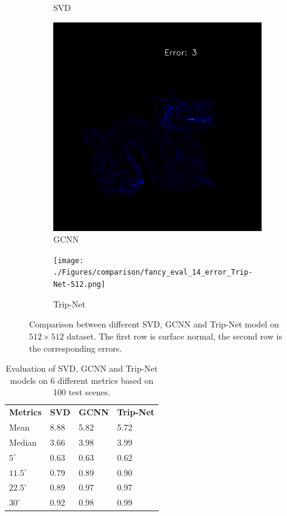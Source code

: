 \documentclass[border=15pt, multi, tikz]{article}
\newcommand{\tabhead}[1]{\textbf{#1}}
\begin{document}
\begin{figure}[H]
\begin{subfigure}[b]{0.24\linewidth}
		\caption{SVD}
	\end{subfigure}
	\begin{subfigure}[b]{0.24\linewidth}
		\includegraphics[width=\linewidth]{./Figures/comparison/fancy_eval_22_error_GCNN-512.png}
		\caption{GCNN}
	\end{subfigure}
	\begin{subfigure}[b]{0.24\linewidth}
		\texttt{[image: ./Figures/comparison/fancy\_eval\_14\_error\_Trip-Net-512.png]}
		\caption{Trip-Net}
	\end{subfigure}

	
	
	\caption{Comparison between different SVD, GCNN and Trip-Net model on $ 512\times 512 $ dataset. The first row is surface normal, the second row is the corresponding errors. }
	\label{fig:high_resolution_eval}
\end{figure}

\begin{table}[H]
	\centering
	\begin{tabular}{l l l l }
		\tabhead{Metrics} & \tabhead{SVD} & \tabhead{GCNN} & \tabhead{Trip-Net} \\
		Mean  					& 8.88 & 5.82 & 5.72 \\ 
		\hline
		Median					& 3.66 & 3.98 & 3.99 \\ 
		\hline
		$ 5^\circ $ 			& 0.63 & 0.63 & 0.62 \\
		\hline
		$ 11.5^\circ $ 			& 0.79 & 0.89 & 0.90 \\
		\hline
		$ 22.5^\circ $ 			& 0.89 & 0.97 & 0.97 \\
		\hline
		$ 30^\circ $ 			& 0.92 & 0.98 & 0.99 \\
	\end{tabular}
	\caption{Evaluation of SVD, GCNN and Trip-Net models on 6 different metrics based on 100 test scenes.}	
	\label{tab:high_resolution_eval}
\end{table}
\end{document}
